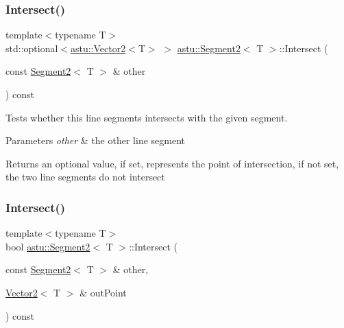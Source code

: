 \subsubsection{\texorpdfstring{Intersect()}{Intersect()}\hspace{0.1cm}{\footnotesize\ttfamily [2/3]}}
{\footnotesize\ttfamily template$<$typename T$>$ \\
std\+::optional$<$\hyperlink{classastu_1_1Vector2}{astu\+::\+Vector2}$<$T$>$ $>$ \hyperlink{classastu_1_1Segment2}{astu\+::\+Segment2}$<$ T $>$\+::Intersect (\begin{DoxyParamCaption}\item[{const \hyperlink{classastu_1_1Segment2}{Segment2}$<$ T $>$ \&}]{other }\end{DoxyParamCaption}) const\hspace{0.3cm}{\ttfamily [inline]}}

Tests whether this line segments intersects with the given segment.


\begin{DoxyParams}{Parameters}
{\em other} & the other line segment \\
\hline
\end{DoxyParams}
\begin{DoxyReturn}{Returns}
an optional value, if set, represents the point of intersection, if not set, the two line segments do not intersect 
\end{DoxyReturn}
\mbox{\label{classastu_1_1Segment2_a302700a61530a0bbe07058917a28cf30}} 
\subsubsection{\texorpdfstring{Intersect()}{Intersect()}\hspace{0.1cm}{\footnotesize\ttfamily [3/3]}}
{\footnotesize\ttfamily template$<$typename T$>$ \\
bool \hyperlink{classastu_1_1Segment2}{astu\+::\+Segment2}$<$ T $>$\+::Intersect (\begin{DoxyParamCaption}\item[{const \hyperlink{classastu_1_1Segment2}{Segment2}$<$ T $>$ \&}]{other,  }\item[{\hyperlink{classastu_1_1Vector2}{Vector2}$<$ T $>$ \&}]{out\+Point }\end{DoxyParamCaption}) const\hspace{0.3cm}{\ttfamily [inline]}}

